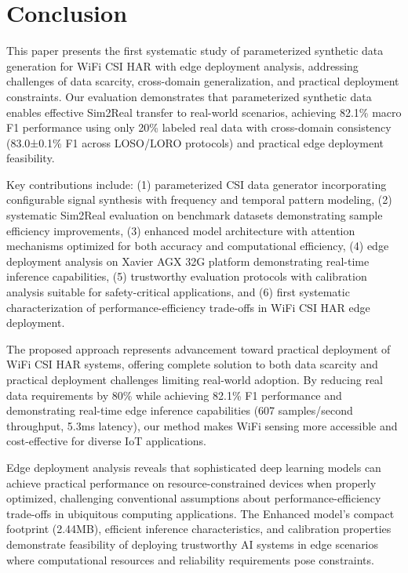 \documentclass[journal]{IEEEtran}
\begin{document}
\section{Conclusion}

This paper presents the first systematic study of parameterized synthetic data generation for WiFi CSI HAR with edge deployment analysis, addressing challenges of data scarcity, cross-domain generalization, and practical deployment constraints. Our evaluation demonstrates that parameterized synthetic data enables effective Sim2Real transfer to real-world scenarios, achieving 82.1\% macro F1 performance using only 20\% labeled real data with cross-domain consistency (83.0±0.1\% F1 across LOSO/LORO protocols) and practical edge deployment feasibility.

Key contributions include: (1) parameterized CSI data generator incorporating configurable signal synthesis with frequency and temporal pattern modeling, (2) systematic Sim2Real evaluation on benchmark datasets demonstrating sample efficiency improvements, (3) enhanced model architecture with attention mechanisms optimized for both accuracy and computational efficiency, (4) edge deployment analysis on Xavier AGX 32G platform demonstrating real-time inference capabilities, (5) trustworthy evaluation protocols with calibration analysis suitable for safety-critical applications, and (6) first systematic characterization of performance-efficiency trade-offs in WiFi CSI HAR edge deployment.

The proposed approach represents advancement toward practical deployment of WiFi CSI HAR systems, offering complete solution to both data scarcity and practical deployment challenges limiting real-world adoption. By reducing real data requirements by 80\% while achieving 82.1\% F1 performance and demonstrating real-time edge inference capabilities (607 samples/second throughput, 5.3ms latency), our method makes WiFi sensing more accessible and cost-effective for diverse IoT applications.

Edge deployment analysis reveals that sophisticated deep learning models can achieve practical performance on resource-constrained devices when properly optimized, challenging conventional assumptions about performance-efficiency trade-offs in ubiquitous computing applications. The Enhanced model's compact footprint (2.44MB), efficient inference characteristics, and calibration properties demonstrate feasibility of deploying trustworthy AI systems in edge scenarios where computational resources and reliability requirements pose constraints.
\end{document}
